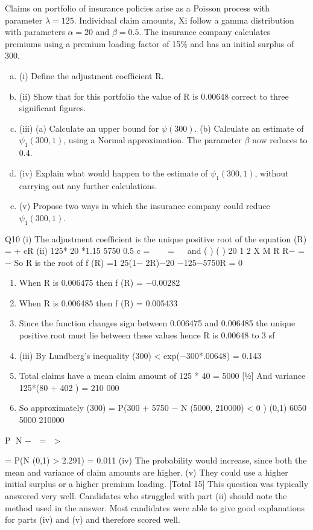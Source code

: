 \documentclass[a4paper,12pt]{article}
\begin{document}
Claims on portfolio of insurance policies arise as a Poisson process with parameter
$\lambda = 125$. Individual claim amounts, Xi follow a gamma distribution with parameters
$\alpha = 20$ and $\beta = 0.5$.
The insurance company calculates premiums using a premium loading factor of 15\%
and has an initial surplus of 300.
\begin{enumerate}[(a)]
\item (i) Define the adjustment coefficient R. 
\item (ii) Show that for this portfolio the value of R is 0.00648 correct to three
significant figures. 
\item (iii) (a) Calculate an upper bound for $\psi(300)$.
(b) Calculate an estimate of $\psi_1(300,1)$, using a Normal approximation. 
The parameter $\beta$ now reduces to 0.4.
\item (iv) Explain what would happen to the estimate of $\psi_1(300,1)$, without carrying out
any further calculations. 
\item (v) Propose two ways in which the insurance company could reduce $\psi_1(300,1)$.
\end{enumerate}

Q10 (i) The adjustment coefficient is the unique positive root of the equation
\lambdaMX (R) = \lambda + cR 
(ii) 125* 20 *1.15 5750
0.5
c =   =
   
and
( ) ( ) 20 1 2 X M R R− = − 
So R is the root of
f (R) =1 25(1− 2R)−20 −125−5750R = 0
\begin{enumerate}
\item When R is 0.006475 then f (R) = −0.00282
\item When R is 0.006485 then f (R) = 0.005433 
\item Since the function changes sign between 0.006475 and 0.006485 the unique
positive root must lie between these values hence R is 0.00648 to 3 sf 
\item (iii) By Lundberg’s inequality \psi(300) < exp(−300*.00648) = 0.143 
\item Total claims have a mean claim amount of 125 * 40 = 5000 [½]
And variance 125*(80 + 402 ) = 210 000 
\item So approximately
 (300) = P(300 + 5750 − N (5000, 210000) < 0 )
(0,1) 6050 5000
210000
\end{enumerate}
P N −  =  > 
 

= P(N (0,1) > 2.291) = 0.011 
(iv) The probability would increase, since both the mean and variance of claim
amounts are higher. 
(v) They could use a higher initial surplus or a higher premium loading. 
[Total 15]
\newpage
This question was typically answered very well. Candidates who struggled
with part (ii) should note the method used in the answer. Most candidates
were able to give good explanations for parts (iv) and (v) and therefore scored
well.
\end{document}
